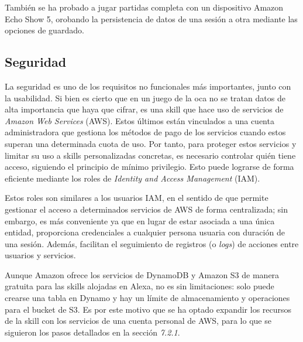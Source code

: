 También se ha probado a jugar partidas completa con un dispositivo Amazon Echo Show 5, orobando la persistencia de datos de una sesión a otra mediante las opciones de guardado.

\newpage
\subsection{Seguridad}

La seguridad es uno de los requisitos no funcionales más importantes, junto con la usabilidad. Si bien es cierto que en un juego de la oca no se tratan datos de alta importancia que haya que cifrar, es una skill que hace uso de servicios de \textit{Amazon Web Services} (AWS). Estos últimos están vinculados a una cuenta administradora que gestiona los métodos de pago de los servicios cuando estos superan una determinada cuota de uso. Por tanto, para proteger estos servicios y limitar su uso a skills personalizadas concretas, es necesario controlar quién tiene acceso, siguiendo el principio de mínimo privilegio. Esto puede lograrse de forma eficiente mediante los roles de \textit{Identity and Access Management} (IAM).

Estos roles son similares a los usuarios IAM, en el sentido de que permite gestionar el acceso a determinados servicios de AWS de forma centralizada; sin embargo, es más conveniente ya que en lugar de estar asociada a una única entidad, proporciona credenciales a cualquier persona usuaria con duración de una sesión. Además, facilitan el seguimiento de registros (o \textit{logs}) de acciones entre usuarios y servicios.

Aunque Amazon ofrece los servicios de DynamoDB y Amazon S3 de manera gratuita para las skills alojadas en Alexa, no es sin limitaciones: solo puede crearse una tabla en Dynamo y hay un límite de almacenamiento y operaciones para el bucket de S3. Es por este motivo que se ha optado expandir los recursos de la skill con los servicios de una cuenta personal de AWS, para lo que se siguieron los pasos detallados en la sección \textit{7.2.1}.


